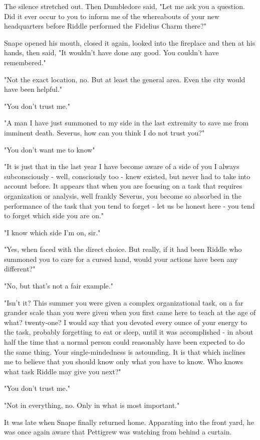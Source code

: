 The silence stretched out. Then Dumbledore said, "Let me ask you a question. Did it ever occur to you to inform me of the whereabouts of your new headquarters before Riddle performed the Fidelius Charm there?"

Snape opened his mouth, closed it again, looked into the fireplace and then at his hands, then said, "It wouldn't have done any good. You couldn't have remembered."

"Not the exact location, no. But at least the general area. Even the city would have been helpful."

"You don't trust me."

"A man I have just summoned to my side in the last extremity to save me from imminent death. Severus, how can you think I do not trust you?"

"You don't want me to know{\el}"

"It is just that in the last year I have become aware of a side of you I always subconsciously - well, consciously too - knew existed, but never had to take into account before. It appears that when you are focusing on a task that requires organization or analysis, well frankly Severus, you become so absorbed in the performance of the task that you tend to forget - let us be honest here - you tend to forget which side you are on."

"I know which side I'm on, sir."

"Yes, when faced with the direct choice. But really, if it had been Riddle who summoned you to care for a cursed hand, would your actions have been any different?"

"No, but that's not a fair example."

"Isn't it? This summer you were given a complex organizational task, on a far grander scale than you were given when you first came here to teach at the age of what? twenty-one? I would say that you devoted every ounce of your energy to the task, probably forgetting to eat or sleep, until it was accomplished - in about half the time that a normal person could reasonably have been expected to do the same thing. Your single-mindedness is astounding. It is that which inclines me to believe that you should know only what you have to know. Who knows what task Riddle may give you next?"

"You don't trust me."

"Not in everything, no. Only in what is most important."

It was late when Snape finally returned home. Apparating into the front yard, he was once again aware that Pettigrew was watching from behind a curtain.

